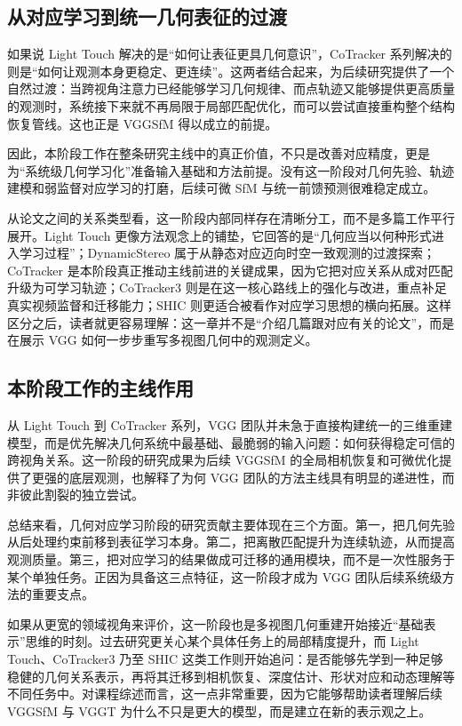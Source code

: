 \subsection{从对应学习到统一几何表征的过渡}

如果说 Light Touch 解决的是“如何让表征更具几何意识”，CoTracker 系列解决的则是“如何让观测本身更稳定、更连续”。这两者结合起来，为后续研究提供了一个自然过渡：当跨视角注意力已经能够学习几何规律、而点轨迹又能够提供更高质量的观测时，系统接下来就不再局限于局部匹配优化，而可以尝试直接重构整个结构恢复管线。这也正是 VGGSfM 得以成立的前提。

因此，本阶段工作在整条研究主线中的真正价值，不只是改善对应精度，更是为“系统级几何学习化”准备输入基础和方法前提。没有这一阶段对几何先验、轨迹建模和弱监督对应学习的打磨，后续可微 SfM 与统一前馈预测很难稳定成立。

从论文之间的关系类型看，这一阶段内部同样存在清晰分工，而不是多篇工作平行展开。Light Touch 更像方法观念上的铺垫，它回答的是“几何应当以何种形式进入学习过程”；DynamicStereo 属于从静态对应迈向时空一致观测的过渡探索；CoTracker 是本阶段真正推动主线前进的关键成果，因为它把对应关系从成对匹配升级为可学习轨迹；CoTracker3 则是在这一核心路线上的强化与改进，重点补足真实视频监督和迁移能力；SHIC 则更适合被看作对应学习思想的横向拓展。这样区分之后，读者就更容易理解：这一章并不是“介绍几篇跟对应有关的论文”，而是在展示 VGG 如何一步步重写多视图几何中的观测定义。

\subsection{本阶段工作的主线作用}

从 Light Touch 到 CoTracker 系列，VGG 团队并未急于直接构建统一的三维重建模型，而是优先解决几何系统中最基础、最脆弱的输入问题：如何获得稳定可信的跨视角关系。这一阶段的研究成果为后续 VGGSfM 的全局相机恢复和可微优化提供了更强的底层观测，也解释了为何 VGG 团队的方法主线具有明显的递进性，而非彼此割裂的独立尝试。

总结来看，几何对应学习阶段的研究贡献主要体现在三个方面。第一，把几何先验从后处理约束前移到表征学习本身。第二，把离散匹配提升为连续轨迹，从而提高观测质量。第三，把对应学习的结果做成可迁移的通用模块，而不是一次性服务于某个单独任务。正因为具备这三点特征，这一阶段才成为 VGG 团队后续系统级方法的重要支点。

如果从更宽的领域视角来评价，这一阶段也是多视图几何重建开始接近“基础表示”思维的时刻。过去研究更关心某个具体任务上的局部精度提升，而 Light Touch、CoTracker3 乃至 SHIC 这类工作则开始追问：是否能够先学到一种足够稳健的几何关系表示，再将其迁移到相机恢复、深度估计、形状对应和动态理解等不同任务中。对课程综述而言，这一点非常重要，因为它能够帮助读者理解后续 VGGSfM 与 VGGT 为什么不只是更大的模型，而是建立在新的表示观之上。
